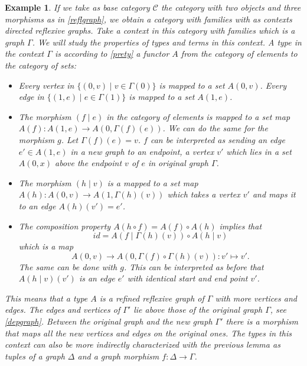 \documentclass[12pt,a4paper,twoside,xetex]{book}
\newtheorem{example}[theorem]{Example}
\begin{document}
\begin{example}
If we take as base category $\mathcal{C}$ the category with two objects and three morphisms as in \cref{reflgraph}, we obtain a category with families with as contexts directed reflexive graphs. Take a context in this category with families which is a graph $\Gamma$. We will study the properties of types and terms in this context. A type in the context $\Gamma$ is according to \cref{prety} a functor $A$ from the category of elements to the category of sets:
\begin{itemize}
\item Every vertex in $\{ (0, v) \mid v \in \Gamma (0) \}$ is mapped to a set $A(0,v)$. Every edge in $\{ (1, e) \mid e \in \Gamma (1) \}$ is mapped to a set $A(1,e)$.

\item The morphism $(f \mid e)$ in the category of elements is mapped to a set map $A(f): A(1,e) \rightarrow A(0, \Gamma (f) (e))$.  We can do the same for the morphism $g$. Let $\Gamma (f) (e) =v$. $f$ can be interpreted as sending an edge $e' \in A(1,e)$ in a new graph to an endpoint, a vertex $v'$ which lies in a set $A(0, x)$ above the endpoint $v$ of $e$ in original graph $\Gamma$.
 
\item The morphism $(h \mid v)$ is a mapped to a set map $A(h) : A(0,v) \rightarrow A(1, \Gamma (h) (v) )$ which takes a vertex $v'$ and maps it to an edge $A(h)(v')=e'$.

\item The composition property $A(h \circ f) = A(f) \circ A(h)$ implies that $$id = A \left( f \mid \Gamma (h) (v) \right) \circ A \left( h \mid v \right)$$ which is a map $$A(0,v) \rightarrow A(0, \Gamma (f) \circ \Gamma (h) (v)): v' \mapsto v'.$$ The same can be done with $g$. This can be interpreted as before that $A(h \mid v)(v')$ is an edge $e'$ with identical start and end point $v'$.
\end{itemize}

This means that a type $A$ is a refined reflexive graph of $\Gamma$ with more vertices and edges. The edges and vertices of $\Gamma '$ lie above those of the original graph $\Gamma$, see \cref{depgraph}. Between the original graph and the new graph $\Gamma'$ there is a morphism that maps all the new vertices and edges on the original ones. The types in this context can also be more indirectly characterized with the previous lemma as tuples of a graph $\Delta$ and a graph morphism $f:\Delta \rightarrow \Gamma$.


\end{example}
\end{document}
